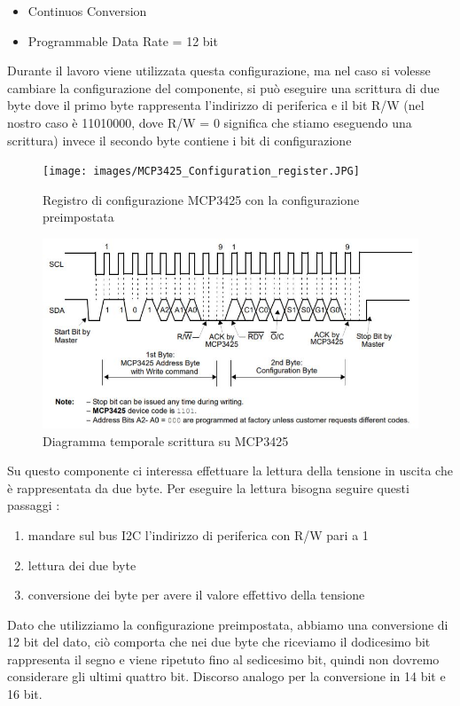\documentclass[12pt, a4paper, titlepage, oneside]{book}
\begin{document}
\begin{flushleft}
\begin{itemize}
    \item Continuos Conversion
    \item Programmable Data Rate = 12 bit
\end{itemize}
Durante il lavoro viene utilizzata questa configurazione, ma nel caso si volesse cambiare la configurazione del componente, si può eseguire una scrittura di due byte dove il primo byte rappresenta l'indirizzo di periferica e il bit R/W (nel nostro caso è 11010000, dove R/W = 0 significa che stiamo eseguendo una scrittura) invece il secondo byte contiene i bit di configurazione\\
\begin{figure}[h]
    \centering
    \texttt{[image: images/MCP3425\_Configuration\_register.JPG]}
    \caption{Registro di configurazione MCP3425 con la configurazione preimpostata}
    \label{fig:CONFIG_REG_MCP3425}
\end{figure}
\newpage
\begin{figure}[h]
    \centering
    \includegraphics[scale = 1]{wrtie_configuration_MCP3425.JPG}
    \caption{Diagramma temporale scrittura su MCP3425}
    \label{fig:MCP3425_wrtie_conf}
\end{figure}
Su questo componente ci interessa effettuare la lettura della tensione in uscita che è rappresentata da due byte. Per eseguire la lettura bisogna seguire questi passaggi :
\begin{enumerate}
    \item mandare sul bus I2C l'indirizzo di periferica con R/W pari a 1
    \item lettura dei due byte
    \item conversione dei byte per avere il valore effettivo della tensione
\end{enumerate}

Dato che utilizziamo la configurazione preimpostata, abbiamo una conversione di 12 bit del dato, ciò comporta che nei due byte che riceviamo il dodicesimo bit rappresenta il segno e viene ripetuto fino al sedicesimo bit, quindi non dovremo considerare gli ultimi quattro bit.
Discorso analogo per la conversione in 14 bit e 16 bit.


\end{flushleft}
\end{document}
